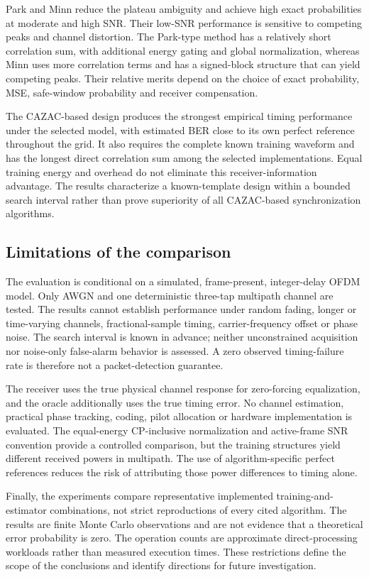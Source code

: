 Park and Minn reduce the plateau ambiguity and achieve high exact probabilities at moderate and high SNR. Their low-SNR performance is sensitive to competing peaks and channel distortion. The Park-type method has a relatively short correlation sum, with additional energy gating and global normalization, whereas Minn uses more correlation terms and has a signed-block structure that can yield competing peaks. Their relative merits depend on the choice of exact probability, MSE, safe-window probability and receiver compensation.

The CAZAC-based design produces the strongest empirical timing performance under the selected model, with estimated BER close to its own perfect reference throughout the grid. It also requires the complete known training waveform and has the longest direct correlation sum among the selected implementations. Equal training energy and overhead do not eliminate this receiver-information advantage. The results characterize a known-template design within a bounded search interval rather than prove superiority of all CAZAC-based synchronization algorithms.

\subsection{Limitations of the comparison}
The evaluation is conditional on a simulated, frame-present, integer-delay OFDM model. Only AWGN and one deterministic three-tap multipath channel are tested. The results cannot establish performance under random fading, longer or time-varying channels, fractional-sample timing, carrier-frequency offset or phase noise. The search interval is known in advance; neither unconstrained acquisition nor noise-only false-alarm behavior is assessed. A zero observed timing-failure rate is therefore not a packet-detection guarantee.

The receiver uses the true physical channel response for zero-forcing equalization, and the oracle additionally uses the true timing error. No channel estimation, practical phase tracking, coding, pilot allocation or hardware implementation is evaluated. The equal-energy CP-inclusive normalization and active-frame SNR convention provide a controlled comparison, but the training structures yield different received powers in multipath. The use of algorithm-specific perfect references reduces the risk of attributing those power differences to timing alone.

Finally, the experiments compare representative implemented training-and-estimator combinations, not strict reproductions of every cited algorithm. The results are finite Monte Carlo observations and are not evidence that a theoretical error probability is zero. The operation counts are approximate direct-processing workloads rather than measured execution times. These restrictions define the scope of the conclusions and identify directions for future investigation.

